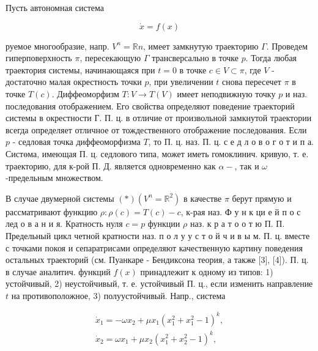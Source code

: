 \documentclass[10pt]{article}
\begin{document}
Пусть автономная система



\[

\dot{x}=f(x)

\]



руемое многообразие, напр. $V^{n}=\mathbb{R} n$, имеет замкнутую траекторию $\Gamma$. Проведем гиперповерхность $\pi$, пересекающую $\Gamma$ трансверсально в точке $p$. Тогда любая траектория системы, начинающаяся при $t=0$ в точке $c \in V \subset \pi$, где $V$ - достаточно малая окрестность точки $p$, при увеличении $t$ снова пересечет $\pi$ в точке $T(c)$. Диффеоморфизм $T: V \rightarrow T(V)$ имеет неподвижную точку $p$ и наз. последования отображением. Его свойства определяют поведение траекторий системы в окрестности Г. П. ц. в отличие от произвольной замкнутой траектории всегда определяет отличное от тождественного отображение последования. Если $p$ - седловая точка диффеоморфизма $T$, то П. ц. наз. П. ц. с е д л о в о г о т и п а. Систөма, имеющая П. ц. седлового типа, может иметь гомоклинич. кривую, т. е. траекторию, для к-рой П. Д. является одновременно как $\alpha-$, так и $\omega$-предельным множеством.



В случае двумерной системы $(*)\left(V^{n}=\mathbb{R}^{2}\right)$ в качестве $\pi$ берут прямую и рассматривают функцию $\rho: \rho(c)=T(c)-c$, к-рая наз. Ф у н к ци е й п о с лед о в а н и я. Кратность нуля $c=p$ функции $\rho$ наз. к р а т о о т ю П. П. Предельный цикл четной кратности наз. п о л у у с т о й ч и в ы м. П. ц. вместе с точками покоя и сепаратрисами определяют качественную картину поведения остальных траекторий (см. Пуанкаре - Бендиксона теория, а также [3], [4]). П. ц. в случае аналитич. функций $f(x)$ принадлежит к одному из типов: 1) устойчивый, 2) неустойчивый, т. е. устойчивый П. ц., если изменить направление $t$ на противоположное, 3) полуустойчивый. Напр., система



\[

\begin{gathered}

\dot{x}_{1}=-\omega x_{2}+\mu x_{1}\left(x_{1}^{2}+x_{1}^{2}-1\right)^{k}, \\

\dot{x}_{2}=\omega x_{1}+\mu x_{2}\left(x_{1}^{2}+x_{2}^{2}-1\right)^{k},

\end{gathered}

\]
\end{document}
